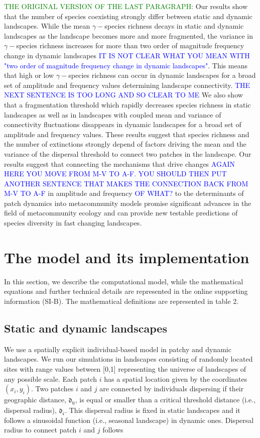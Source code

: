 \documentclass[12pt]{article}
\newcommand{\GM}[1]{\textcolor{Blue}{#1}}
\newcommand{\JK}[1]{\textcolor{Green}{#1}}
\begin{document}
\JK{THE ORIGINAL VERSION OF THE LAST PARAGRAPH:}
Our results show that the number of species coexisting strongly differ between static and dynamic landscapes. While the mean $\gamma-$species richness decays in static and dynamic landscapes as the landscape becomes more and more fragmented, the variance in $\gamma-$species richness increases for more than two order of magnitude frequency change in dynamic landscapes \GM{IT IS NOT CLEAR WHAT YOU MEAN WITH "two order of magnitude frequency change in dynamic landscapes"}. This means that high or low $\gamma-$species richness can occur in dynamic landscapes for a broad set of amplitude and frequency values determining landscape connectivity. \GM{THE NEXT SENTENCE IS TOO LONG AND SO CLEAR TO ME} We also show that a fragmentation threshold which rapidly decreases species richness in static landscapes as well as in landscapes with coupled mean and variance of connectivity fluctuations disappears in dynamic landscapes for a broad set of amplitude and frequency values. These results suggest that species richness and the number of extinctions strongly depend of factors driving the mean and the variance of the dispersal threshold to connect two patches in the landscape. Our results suggest that connecting the mechanisms that drive changes \GM{AGAIN HERE YOU MOVE FROM M-V TO A-F. YOU SHOULD THEN PUT ANOTHER SENTENCE THAT MAKES THE CONNECTION BACK FROM M-V TO A-F} in amplitude and frequency \GM{OF WHAT?} to the determinants of patch dynamics into metacommunity models promise significant advances in the field of metacommunity ecology and can provide new testable predictions of species diversity in fast changing landscapes.

\section*{The model and its implementation}

In this section, we describe the computational model, while the
mathematical equations and further technical details are represented
in the online supporting information (SI-B). The mathematical
definitions are represented in table 2.

\subsection*{Static and dynamic landscapes}

We use a spatially explicit individual-based model in patchy and
dynamic landscapes. We run our simulations in landscapes consisting of
randomly located sites with range values between [0,1] representing
the universe of landscapes of any possible scale. Each patch $i$ has a
spatial location given by the coordinates $(x_{i}, y_{i})$. Two
patches $i$ and $j$ are connected by individuals dispersing if their
geographic distance, $\mathfrak{d_{ij}}$, is equal or smaller than a
critical threshold distance (i.e., dispersal radius),
$\mathfrak{d_{c}}$. This dispersal radius is fixed in static
landscapes and it follows a sinusoidal function (i.e., seasonal
landscape) in dynamic ones. Dispersal radius to connect patch $i$ and
$j$ follows
\end{document}
